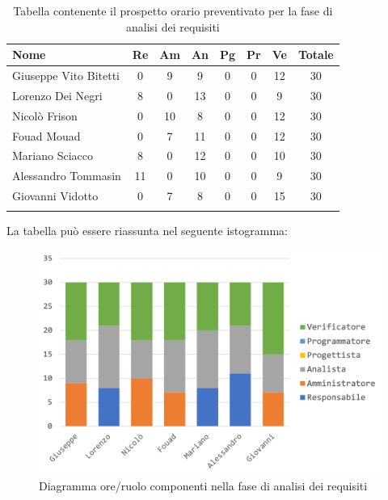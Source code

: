 			\begin{longtable}{|l|c|c|c|c|c|c|c|}
				\hline
				\rowcolor{lighter-grayer}
				\textbf{Nome} & \textbf{Re} & \textbf{Am} & \textbf{An} & \textbf{Pg}  & \textbf{Pr}   & \textbf{Ve} & \textbf{Totale} \\
				\hline
				\endfirsthead
				
				\hline
				Giuseppe Vito Bitetti & 0 & 9 & 9 & 0 & 0 & 12 & 30\\
				\hline
				\hline
				Lorenzo Dei Negri & 8 & 0 & 13 & 0 & 0 & 9 & 30\\
				\hline
				\hline
				Nicolò Frison & 0 & 10 & 8 & 0 & 0 & 12 & 30\\
				\hline
				\hline
				Fouad Mouad & 0 & 7 & 11 & 0 & 0 & 12 & 30\\
				\hline
				\hline
				Mariano Sciacco & 8 & 0 & 12 & 0 & 0 & 10 & 30\\
				\hline
				\hline
				Alessandro Tommasin & 11 & 0 & 10 & 0 & 0 & 9 & 30\\
				\hline
				\hline
				Giovanni Vidotto & 0 & 7 & 8 & 0 & 0 & 15 & 30\\
				\hline 
				\caption{Tabella contenente il prospetto orario preventivato per la fase di analisi dei requisiti}
			\end{longtable}
			\pagebreak
		
			La tabella può essere riassunta nel seguente istogramma:
		
			\begin{figure}[H]
				\centering
				\includegraphics[width=0.8\linewidth]{./images/preventivo/analisi1.png}
				\caption{Diagramma ore/ruolo componenti nella fase di analisi dei requisiti}
				\label{fig:diagramma suddivione ruoli fase analisi dei requisiti}
			\end{figure}
		
